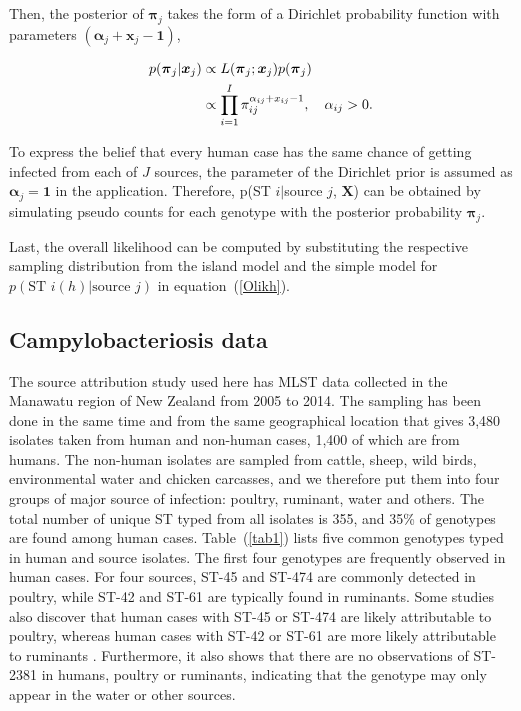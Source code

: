 \documentclass[times, doublespace]{WileyNJD-v2}%
\begin{document}
Then, the posterior of $\boldsymbol{\pi}_{j}$ takes the form of a Dirichlet probability function with parameters $(\boldsymbol{\alpha}_{j}+\boldsymbol{x}_{j}-\boldsymbol{1})$,

\begin{align}
        p(\boldsymbol{\pi}_{j} \vert \boldsymbol{x}_{j} ) & \propto L(\boldsymbol{\pi}_{j} ; \boldsymbol{x}_{j}) p(\boldsymbol{\pi}_{j}) \notag \\ 
       & \propto \prod_{i=1}^{I}\pi_{ij}^{\alpha_{ij} + x_{ij}-1}, \quad \alpha_{ij} >0. \notag
 \end{align}

To express the belief that every human case has the same chance of getting infected from each of $J$ sources, the parameter of the Dirichlet prior is assumed as $\boldsymbol{\alpha}_{j}=\boldsymbol{1}$ in the application. Therefore, p(ST $i\vert$source $j$, $\boldsymbol{X}$) can be obtained by simulating pseudo counts for each genotype with the posterior probability $\boldsymbol{\pi}_{j}$.

Last, the overall likelihood can be computed by substituting the respective sampling distribution from the island model and the simple model for $p(\text{ST }i(h)\vert\text{source }j)$ in equation~(\ref{Olikh}). 


\subsection{Campylobacteriosis data}
The source attribution study used here has MLST data collected in the Manawatu region of New Zealand from 2005 to 2014. The sampling has been done in the same time and from the same geographical location that gives 3,480 isolates taken from human and non-human cases, 1,400 of which are from humans. The non-human isolates are sampled from cattle, sheep, wild birds, environmental water and chicken carcasses, and we therefore put them into four groups of major source of infection: poultry, ruminant, water and others. The total number of unique ST typed from all isolates is 355, and 35\% of genotypes are found among human cases. Table~(\ref{tab1}) lists five common genotypes typed in human and source isolates. The first four genotypes are frequently observed in human cases. For four sources, ST-45 and ST-474 are commonly detected in poultry, while ST-42 and ST-61 are typically found in ruminants. Some studies also discover that human cases with ST-45 or ST-474 are likely attributable to poultry, whereas human cases with ST-42 or ST-61 are more likely attributable to ruminants \cite{Muell, Coll, Cart}. Furthermore, it also shows that there are no observations of ST-2381 in humans, poultry or ruminants, indicating that the genotype may only appear in the water or other sources.
\end{document}
